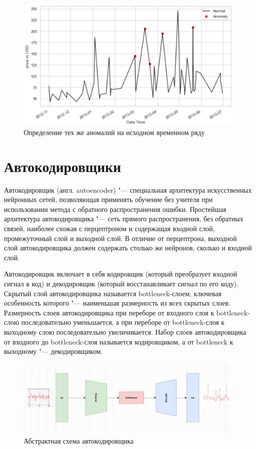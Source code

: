 \documentclass[bachelor, och, referat]{../shiza}
\begin{document}
        \begin{figure}[H]
            \centering
            \includegraphics[width=1\textwidth]{pic/clust2.png}
            \caption{Определение тех же аномалий на исходном временном ряду}
        \end{figure}

\section{Автокодировщики}

    Автокодировщик (англ. autoencoder) "--- специальная архитектура
    искусственных нейронных сетей, позволяющая применять обучение без учителя
    при использовании метода с обратного распространения ошибки. Простейшая
    архитектура автокодировщика "--- сеть прямого распространения, без обратных
    связей, наиболее схожая с перцептроном и содержащая входной слой,
    промежуточный слой и выходной слой. В отличие от перцептрона, выходной слой
    автокодировщика должен содержать столько же нейронов, сколько и входной
    слой.

    Автокодировщик включает в себя кодировщик (который преобразует входной
    сигнал в код) и декодировщик (который восстанавливает сигнал по его коду).
    Скрытый слой автокодировщика называется bottleneck-слоем, ключевая
    особенность которого "--- наименьшая размерность из всех скрытых слоев.
    Размерность слоев автокодировщика при переборе от входного слоя к
    bottleneck-слою последовательно уменьшается, а при переборе от
    bottleneck-слоя к выходному слою последовательно увеличивается. Набор слоев
    автокодировщика от входного до bottleneck-слоя называется кодировщиком, а от
    bottleneck к выходному "--- декодировщиком.

    \begin{figure}[H]
        \centering
        \includegraphics[width=1\textwidth]{pic/autoenc.png}
        \caption{Абстрактная схема автокодировщика}
    \end{figure}
\end{document}
